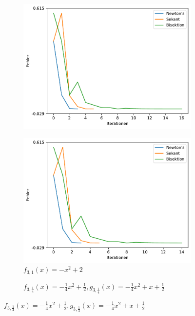 \documentclass[10pt]{scrartcl}
\newcommand{\1}{1\hspace{-0,9ex}1}
\begin{document}
\begin{figure}[!h]
\begin{subfigure}[b]{0.4\textwidth}
			\includegraphics[width=\textwidth]{plots/plot2.pdf}
		\end{subfigure}
		\begin{subfigure}[b]{0.4\textwidth}
			\caption*{$f_{3,1}(x) = -x^2 + 2$}
			\includegraphics[width=\textwidth]{plots/plot3.pdf}
		\end{subfigure}
		\begin{subfigure}[b]{0.4\textwidth}
			\caption*{$f_{3,\frac{1}{4}}(x) = -\frac{1}{4}x^2 +\frac{1}{2},  g_{3,\frac{1}{4}}(x)=-\frac{1}{4}x^2 + x + \frac{1}{2}$}

\end{subfigure}
\end{figure}
\end{document}
